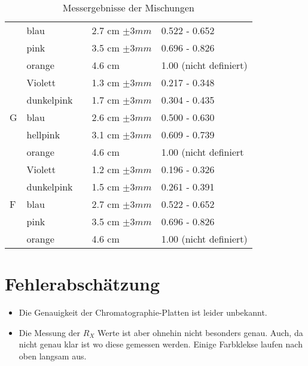 \documentclass[11pt,paper=a4,final]{scrartcl}
\begin{document}
\begin{savenotes}
\begin{table}[ht!]
\begin{tabular}{|l|l|l|l|l|}
      			& blau		& 				& 2.7 cm \(\pm 3 mm \)	& 0.522 - 0.652		\\
      			& pink		&				& 3.5 cm \(\pm 3 mm \)	& 0.696 - 0.826		\\
			& orange	&				& 4.6 cm 		& 1.00 (nicht definiert)\\ \cline{1-2} \cline{4-5}
      \multirow{5}{*}{G}
			& Violett	&				& 1.3 cm \(\pm 3 mm \)	& 0.217 - 0.348		\\
      			& dunkelpink 	&				& 1.7 cm \(\pm 3 mm \)	& 0.304 - 0.435		\\
			& blau		&				& 2.6 cm \(\pm 3 mm \)	& 0.500 - 0.630		\\
      			& hellpink	& 				& 3.1 cm \(\pm 3 mm \)	& 0.609 - 0.739		\\
      			& orange	&				& 4.6 cm		& 1.00 (nicht definiert \\ \cline{1-2} \cline{4-5}
      \multirow{5}{*}{F}
			& Violett	&				& 1.2 cm \(\pm 3 mm \)	& 0.196 - 0.326		\\
      			& dunkelpink 	&				& 1.5 cm \(\pm 3 mm \)	& 0.261 - 0.391		\\
      			& blau		& 				& 2.7 cm \(\pm 3 mm \)	& 0.522 - 0.652		\\
      			& pink		&				& 3.5 cm \(\pm 3 mm \)	& 0.696 - 0.826		\\
			& orange	&				& 4.6 cm 		& 1.00 (nicht definiert)\\ \hline

    \end{tabular}
    \caption{Messergebnisse der Mischungen}
  \end{table}
\end{savenotes}

\section{Fehlerabsch\"atzung}
\begin{itemize}
  \item Die Genauigkeit der Chromatographie-Platten ist leider unbekannt.
  \item Die Messung der \( R_X \) Werte ist aber ohnehin nicht besonders genau. Auch, da nicht genau klar ist wo diese gemessen werden. Einige Farbklekse laufen nach oben langsam aus.
\end{itemize}
\end{document}
